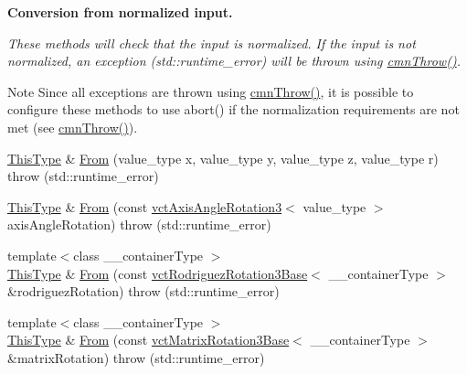 \begin{Indent}{\bf Conversion from normalized input.}\par
{\em These methods will check that the input is normalized. If the input is not normalized, an exception ({\ttfamily std\+::runtime\+\_\+error}) will be thrown using \hyperlink{_minimal_cmn_8h_ad50e82cf9c9dbd0e6443c13e0d1a6f1a}{cmn\+Throw()}.

\begin{DoxyNote}{Note}
Since all exceptions are thrown using \hyperlink{_minimal_cmn_8h_ad50e82cf9c9dbd0e6443c13e0d1a6f1a}{cmn\+Throw()}, it is possible to configure these methods to use {\ttfamily abort()} if the normalization requirements are not met (see \hyperlink{_minimal_cmn_8h_ad50e82cf9c9dbd0e6443c13e0d1a6f1a}{cmn\+Throw()}). 
\end{DoxyNote}
}\begin{DoxyCompactItemize}
\item 
\hyperlink{classvct_quaternion_base_af28efdc38acf89acb7a67afada11408c}{This\+Type} \& \hyperlink{classvct_quaternion_rotation3_base_a24fb234e60ece7a6b04f6f53339f38fe}{From} (value\+\_\+type x, value\+\_\+type y, value\+\_\+type z, value\+\_\+type r)  throw (std\+::runtime\+\_\+error)
\item 
\hyperlink{classvct_quaternion_base_af28efdc38acf89acb7a67afada11408c}{This\+Type} \& \hyperlink{classvct_quaternion_rotation3_base_a1c2c3f6c860184f92ee7475a18b6f67e}{From} (const \hyperlink{classvct_axis_angle_rotation3}{vct\+Axis\+Angle\+Rotation3}$<$ value\+\_\+type $>$ axis\+Angle\+Rotation)  throw (std\+::runtime\+\_\+error)
\item 
{\footnotesize template$<$class \+\_\+\+\_\+container\+Type $>$ }\\\hyperlink{classvct_quaternion_base_af28efdc38acf89acb7a67afada11408c}{This\+Type} \& \hyperlink{classvct_quaternion_rotation3_base_a7f5cf5bd55cb472c1e18829123b61702}{From} (const \hyperlink{classvct_rodriguez_rotation3_base}{vct\+Rodriguez\+Rotation3\+Base}$<$ \+\_\+\+\_\+container\+Type $>$ \&rodriguez\+Rotation)  throw (std\+::runtime\+\_\+error)
\item 
{\footnotesize template$<$class \+\_\+\+\_\+container\+Type $>$ }\\\hyperlink{classvct_quaternion_base_af28efdc38acf89acb7a67afada11408c}{This\+Type} \& \hyperlink{classvct_quaternion_rotation3_base_ac18f7eca8d1c4cbe11352120ea21f8ef}{From} (const \hyperlink{classvct_matrix_rotation3_base}{vct\+Matrix\+Rotation3\+Base}$<$ \+\_\+\+\_\+container\+Type $>$ \&matrix\+Rotation)  throw (std\+::runtime\+\_\+error)
\end{DoxyCompactItemize}
\end{Indent}
